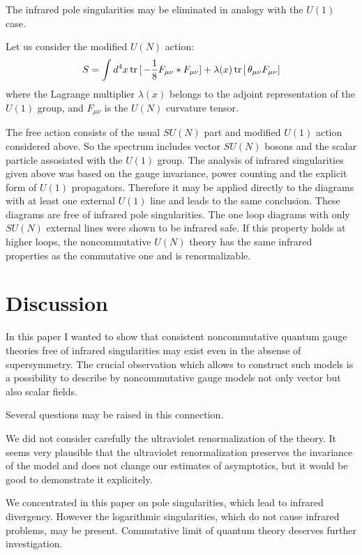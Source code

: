 \documentclass[a4paper,12pt]{article}
\newcommand{\tr}[1]{\,{\rm tr}\,#1\,}
\begin{document}
The infrared pole singularities may be eliminated in analogy with the 
$U(1)$ case.
 
 Let us consider the modified $U(N)$ action:
 \begin{equation} 
 S= \int d^4x \tr[- \frac{1}{8}F_{\mu \nu}*F_{\mu \nu}]+ \lambda(x) 
\tr[\theta_{\mu \nu}F_{\mu \nu}] \label{30} 
\end{equation} 
 where the Lagrange multiplier $\lambda(x)$ belongs to the adjoint 
 representation of the $U(1)$ group, and $F_{\mu \nu}$ is the 
$U(N)$ curvature tensor.
 
 The free action consists of the usual $SU(N)$ part and modified $U(1)$ 
 action considered above. So the spectrum includes vector $SU(N)$ bosons 
and the scalar particle assosiated with the $U(1)$ group. The analysis of 
infrared singularities given above was based on the gauge invariance, 
power counting and the explicit form of $U(1)$ propagators. Therefore 
it may be applied directly to the diagrams with at least one 
external $U(1)$ line and leads to the same conclusion. These diagrams are 
free of infrared pole singularities. The one loop diagrams with only 
$SU(N)$ external lines were shown to be infrared safe. If this 
property holds at higher loops, the noncommutative $U(N)$ theory has the 
same infrared properties as the commutative one and is renormalizable. 
 
\section{Discussion}

In this paper I wanted to show that consistent 
 noncommutative quantum gauge theories free of infrared singularities may 
 exist even in the absense of supersymmetry.  The crucial observation 
 which allows to construct such models is a possibility to describe by 
  noncommutative gauge models not only vector but also scalar fields. 
 
Several questions may be raised in this connection. 
 
 We did not 
 consider carefully the ultraviolet renormalization of the theory. 
 It seems very plausible that the ultraviolet 
 renormalization preserves the invariance of the model and does not 
 change our estimates of asymptotics, but it would be good to demonstrate 
 it explicitely.
 
 We concentrated in this paper on pole singularities, which lead to 
 infrared divergency. However the logarithmic singularities, which do not 
 cause infrared problems, may be present. Commutative limit of 
 quantum theory deserves further investigation.
 
\end{document}
